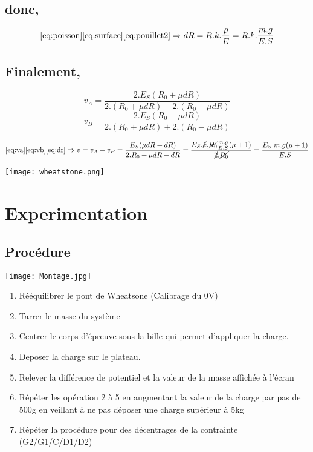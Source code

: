 \documentclass[10pt,a4paper]{report}
\begin{document}
\section*{donc,}
\begin{equation}
\label{eq:dr}
\eqref{eq:poisson} \eqref{eq:surface} \eqref{eq:pouillet2} \Rightarrow dR = R.k.\frac{\rho}{E} = R.k.\frac{m.g}{E.S}
\end{equation}
\section*{Finalement,}
\begin{equation}
\label{eq:va}
v_{A} = \dfrac{2.E_{S}(R_{0}+\mu dR)}{2.(R_{0}+\mu dR)+2.(R_{0}-\mu dR)}
\end{equation}
\begin{equation}
\label{eq:vb}
v_{B} = \dfrac{2.E_{S}(R_{0}-\mu dR)}{2.(R_{0}+\mu dR)+2.(R_{0}-\mu dR)}
\end{equation}

\begin{equation}
\eqref{eq:va} \eqref{eq:vb} \eqref{eq:dr} \Rightarrow v = v_{A} - v_{B} = \dfrac{E_{S}(\mu dR+dR)}{2.R_{0}+\mu dR -dR} = \dfrac{E_{S}.\cancel{k}.\cancel{R_{0}}\frac{m.g}{E.S}(\mu+1)}{\cancel{2}.\cancel{R_{0}}} = \frac{E_{S}.m.g (\mu + 1)}{E.S}
\end{equation}
\begin{center}
\texttt{[image: wheatstone.png]}
\end{center}
\chapter{Experimentation}

\section{Procédure}
\begin{center}
\texttt{[image: Montage.jpg]}
\end{center}
\begin{enumerate}
\item Rééquilibrer le pont de Wheatsone (Calibrage du 0V)
\item Tarrer le masse du système									
\item Centrer le corps d'épreuve sous la bille qui permet d'appliquer la charge.
\item Deposer la charge sur le plateau.
\item Relever la différence de potentiel  et la valeur de la masse affichée à l'écran
\item Répéter les opération 2 à 5 en augmentant la valeur de la charge par pas de 500g en veillant à ne pas déposer une charge supérieur à 5kg
\item Répéter la procédure pour des décentrages de la contrainte (G2/G1/C/D1/D2)
\end{enumerate} 
\end{document}
